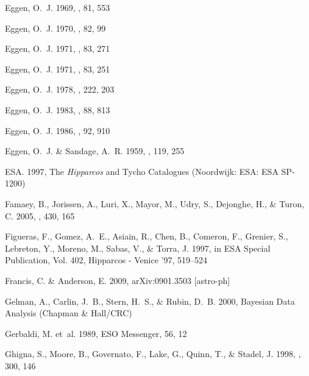\begin{thebibliography}{99}
{Eggen}, O.~J. 1969, \pasp, 81, 553

{Eggen}, O.~J. 1970, \pasp, 82, 99

{Eggen}, O.~J. 1971{}, \pasp, 83, 271

{Eggen}, O.~J. 1971{}, \pasp, 83, 251

{Eggen}, O.~J. 1978, \apj, 222, 203

{Eggen}, O.~J. 1983, \aj, 88, 813

{Eggen}, O.~J. 1986, \aj, 92, 910

{Eggen}, O.~J. \& {Sandage}, A.~R. 1959, \mnras, 119, 255

{ESA}. 1997, {The \emph{Hipparcos} and Tycho Catalogues} (Noordwijk: ESA: {ESA
  SP-1200})

{Famaey}, B., {Jorissen}, A., {Luri}, X., {Mayor}, M., {Udry}, S., {Dejonghe},
  H., \& {Turon}, C. 2005, \aap, 430, 165

{Figueras}, F., {Gomez}, A.~E., {Asiain}, R., {Chen}, B., {Comeron}, F.,
  {Grenier}, S., {Lebreton}, Y., {Moreno}, M., {Sabas}, V., \& {Torra}, J.
  1997, in ESA Special Publication, Vol. 402, Hipparcos - Venice '97, 519--524

{Francis}, C. \& {Anderson}, E. 2009, arXiv:0901.3503 [astro-ph]

{Gelman}, A., {Carlin}, J.~B., {Stern}, H.~S., \& {Rubin}, D.~B. 2000,
  {Bayesian Data Analysis} ({Chapman \& Hall/CRC})

{Gerbaldi}, M. {et~al.} 1989, ESO Messenger, 56, 12

{Ghigna}, S., {Moore}, B., {Governato}, F., {Lake}, G., {Quinn}, T., \&
  {Stadel}, J. 1998, \mnras, 300, 146


\end{thebibliography}
